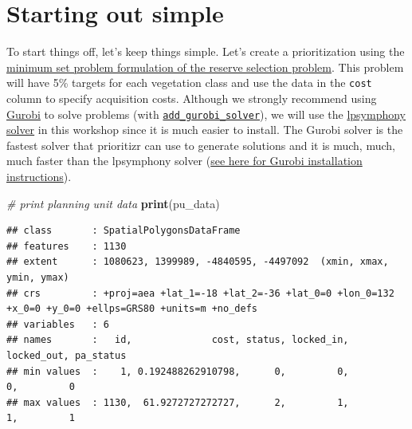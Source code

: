 \documentclass[12pt,]{book}
\newenvironment{Shaded}{\begin{snugshade}}{\end{snugshade}}
\newcommand{\KeywordTok}[1]{\textcolor[rgb]{0.13,0.29,0.53}{\textbf{#1}}}
\newcommand{\DataTypeTok}[1]{\textcolor[rgb]{0.13,0.29,0.53}{#1}}
\newcommand{\FloatTok}[1]{\textcolor[rgb]{0.00,0.00,0.81}{#1}}
\newcommand{\StringTok}[1]{\textcolor[rgb]{0.31,0.60,0.02}{#1}}
\newcommand{\CommentTok}[1]{\textcolor[rgb]{0.56,0.35,0.01}{\textit{#1}}}
\newcommand{\OtherTok}[1]{\textcolor[rgb]{0.56,0.35,0.01}{#1}}
\newcommand{\OperatorTok}[1]{\textcolor[rgb]{0.81,0.36,0.00}{\textbf{#1}}}
\newcommand{\NormalTok}[1]{#1}
\begin{document}
\section{Starting out simple}\label{starting-out-simple}

To start things off, let's keep things simple. Let's create a
prioritization using the
\href{https://prioritizr.net/reference/add_min_set_objective.html}{minimum
set problem formulation of the reserve selection problem}. This problem
will have 5\% targets for each vegetation class and use the data in the
\texttt{cost} column to specify acquisition costs. Although we strongly
recommend using \href{https://www.gurobi.com/}{Gurobi} to solve problems
(with
\href{https://prioritizr.net/reference/add_gurobi_solver.html}{\texttt{add\_gurobi\_solver}}),
we will use the
\href{https://prioritizr.net/reference/add_lsymphony_solver.html}{lpsymphony
solver} in this workshop since it is much easier to install. The Gurobi
solver is the fastest solver that prioritizr can use to generate
solutions and it is much, much, much faster than the lpsymphony solver
(\href{https://prioritizr.net/articles/gurobi_installation.html}{see
here for Gurobi installation instructions}).

\begin{Shaded}
\begin{Highlighting}[]
\CommentTok{# print planning unit data}
\KeywordTok{print}\NormalTok{(pu_data)}
\end{Highlighting}
\end{Shaded}

\begin{verbatim}
## class       : SpatialPolygonsDataFrame 
## features    : 1130 
## extent      : 1080623, 1399989, -4840595, -4497092  (xmin, xmax, ymin, ymax)
## crs         : +proj=aea +lat_1=-18 +lat_2=-36 +lat_0=0 +lon_0=132 +x_0=0 +y_0=0 +ellps=GRS80 +units=m +no_defs 
## variables   : 6
## names       :   id,              cost, status, locked_in, locked_out, pa_status 
## min values  :    1, 0.192488262910798,      0,         0,          0,         0 
## max values  : 1130,  61.9272727272727,      2,         1,          1,         1
\end{verbatim}

\begin{Shaded}
\end{Shaded}
\end{document}
